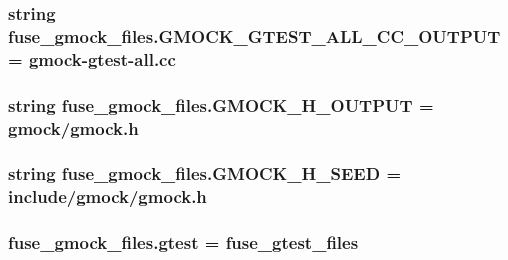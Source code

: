 \subsubsection[{\texorpdfstring{G\+M\+O\+C\+K\+\_\+\+G\+T\+E\+S\+T\+\_\+\+A\+L\+L\+\_\+\+C\+C\+\_\+\+O\+U\+T\+P\+UT}{GMOCK_GTEST_ALL_CC_OUTPUT}}]{\setlength{\rightskip}{0pt plus 5cm}string fuse\+\_\+gmock\+\_\+files.\+G\+M\+O\+C\+K\+\_\+\+G\+T\+E\+S\+T\+\_\+\+A\+L\+L\+\_\+\+C\+C\+\_\+\+O\+U\+T\+P\+UT = \textquotesingle{}gmock-\/{\bf gtest}-\/all.\+cc\textquotesingle{}}\hypertarget{namespacefuse__gmock__files_a9759f3f6c404e3292c26c9317792e846}{}\label{namespacefuse__gmock__files_a9759f3f6c404e3292c26c9317792e846}
\subsubsection[{\texorpdfstring{G\+M\+O\+C\+K\+\_\+\+H\+\_\+\+O\+U\+T\+P\+UT}{GMOCK_H_OUTPUT}}]{\setlength{\rightskip}{0pt plus 5cm}string fuse\+\_\+gmock\+\_\+files.\+G\+M\+O\+C\+K\+\_\+\+H\+\_\+\+O\+U\+T\+P\+UT = \textquotesingle{}gmock/gmock.\+h\textquotesingle{}}\hypertarget{namespacefuse__gmock__files_aba0664abeb60f34cfdf59e8475a465d0}{}\label{namespacefuse__gmock__files_aba0664abeb60f34cfdf59e8475a465d0}
\subsubsection[{\texorpdfstring{G\+M\+O\+C\+K\+\_\+\+H\+\_\+\+S\+E\+ED}{GMOCK_H_SEED}}]{\setlength{\rightskip}{0pt plus 5cm}string fuse\+\_\+gmock\+\_\+files.\+G\+M\+O\+C\+K\+\_\+\+H\+\_\+\+S\+E\+ED = \textquotesingle{}include/gmock/gmock.\+h\textquotesingle{}}\hypertarget{namespacefuse__gmock__files_aa31b816a9048fb3fa9d482eeac69c139}{}\label{namespacefuse__gmock__files_aa31b816a9048fb3fa9d482eeac69c139}
\subsubsection[{\texorpdfstring{gtest}{gtest}}]{\setlength{\rightskip}{0pt plus 5cm}fuse\+\_\+gmock\+\_\+files.\+gtest = fuse\+\_\+gtest\+\_\+files}\hypertarget{namespacefuse__gmock__files_a3fb36dbe8d361f9ecc54e1aa4b94b068}{}\label{namespacefuse__gmock__files_a3fb36dbe8d361f9ecc54e1aa4b94b068}
